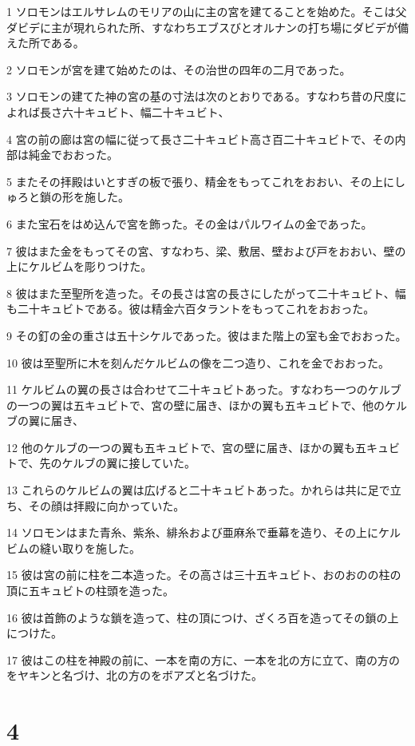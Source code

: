 \par 1 ソロモンはエルサレムのモリアの山に主の宮を建てることを始めた。そこは父ダビデに主が現れられた所、すなわちエブスびとオルナンの打ち場にダビデが備えた所である。
\par 2 ソロモンが宮を建て始めたのは、その治世の四年の二月であった。
\par 3 ソロモンの建てた神の宮の基の寸法は次のとおりである。すなわち昔の尺度によれば長さ六十キュビト、幅二十キュビト、
\par 4 宮の前の廊は宮の幅に従って長さ二十キュビト高さ百二十キュビトで、その内部は純金でおおった。
\par 5 またその拝殿はいとすぎの板で張り、精金をもってこれをおおい、その上にしゅろと鎖の形を施した。
\par 6 また宝石をはめ込んで宮を飾った。その金はパルワイムの金であった。
\par 7 彼はまた金をもってその宮、すなわち、梁、敷居、壁および戸をおおい、壁の上にケルビムを彫りつけた。
\par 8 彼はまた至聖所を造った。その長さは宮の長さにしたがって二十キュビト、幅も二十キュビトである。彼は精金六百タラントをもってこれをおおった。
\par 9 その釘の金の重さは五十シケルであった。彼はまた階上の室も金でおおった。
\par 10 彼は至聖所に木を刻んだケルビムの像を二つ造り、これを金でおおった。
\par 11 ケルビムの翼の長さは合わせて二十キュビトあった。すなわち一つのケルブの一つの翼は五キュビトで、宮の壁に届き、ほかの翼も五キュビトで、他のケルブの翼に届き、
\par 12 他のケルブの一つの翼も五キュビトで、宮の壁に届き、ほかの翼も五キュビトで、先のケルブの翼に接していた。
\par 13 これらのケルビムの翼は広げると二十キュビトあった。かれらは共に足で立ち、その顔は拝殿に向かっていた。
\par 14 ソロモンはまた青糸、紫糸、緋糸および亜麻糸で垂幕を造り、その上にケルビムの縫い取りを施した。
\par 15 彼は宮の前に柱を二本造った。その高さは三十五キュビト、おのおのの柱の頂に五キュビトの柱頭を造った。
\par 16 彼は首飾のような鎖を造って、柱の頂につけ、ざくろ百を造ってその鎖の上につけた。
\par 17 彼はこの柱を神殿の前に、一本を南の方に、一本を北の方に立て、南の方のをヤキンと名づけ、北の方のをボアズと名づけた。

\chapter{4}

